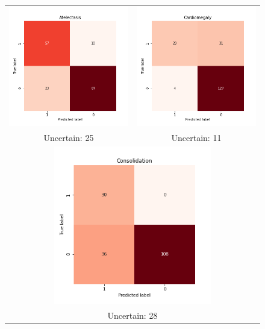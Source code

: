 \begin{figure}[h!]
\begin{tabular}{cc}
  \includegraphics[width=69mm]{Tesi/images/Results/Atelectasis_cf.png} &   \includegraphics[width=69mm]{Tesi/images/Results/Cardiomegaly_cf.png} \\
\footnotesize{Uncertain: 25} & \footnotesize{Uncertain: 11} \\[6pt]
\multicolumn{2}{c}{\includegraphics[width=69mm]{Tesi/images/Results/Consolidation_cf.png} }\\
\multicolumn{2}{c}{\footnotesize{Uncertain: 28}}
\end{tabular}
\end{figure}

